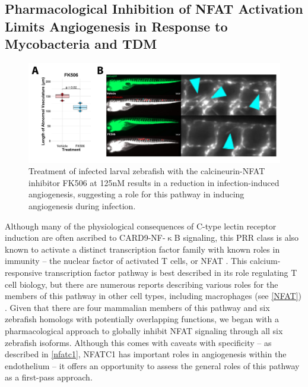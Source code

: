 \subsection{Pharmacological Inhibition of NFAT Activation Limits Angiogenesis in Response to Mycobacteria and TDM}

\begin{figure}
\centering
\includegraphics[width=\textwidth]{images/fk506inf.pdf}
\caption{Treatment of infected larval zebrafish with the calcineurin\hyp{}NFAT inhibitor FK506 at 125nM results in a reduction in infection\hyp{}induced angiogenesis, suggesting a role for this pathway in inducing angiogenesis during infection.}
\label{figure:fk506inf}
\end{figure}

Although many of the physiological consequences of C\hyp{}type lectin receptor induction are often ascribed to CARD9\hyp{}NF\hyp{}$\upkappa$B signaling, this PRR class is also known to activate a distinct transcription factor family with known roles in immunity -- the nuclear factor of activated T cells, or NFAT \citep{Goodridge2007, Deerhake2021}. This calcium\hyp{}responsive transcription factor pathway is best described in its role regulating T cell biology, but there are numerous reports describing various roles for the members of this pathway in other cell types, including macrophages (see \autoref{NFAT}) \citep{Symes1998, Jones2000, Crabtree2002, Horsley2002, Elloumi2012}. Given that there are four mammalian members of this pathway and six zebrafish homologs with potentially overlapping functions, we began with a pharmacological approach to globally inhibit NFAT signaling through all six zebrafish isoforms. Although this comes with caveats with specificity -- as described in \autoref{nfatc1}, NFATC1 has important roles in angiogenesis within the endothelium -- it offers an opportunity to assess the general roles of this pathway as a first\hyp{}pass approach. 

